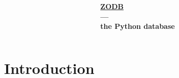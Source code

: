 \documentclass[aspectratio=169]{beamer}
\begin{document}
{
\begin{frame}[plain,t]
  \begin{columns}[onlytextwidth]
    \begin{column}{0.45\textwidth}
    \end{column}
    \begin{column}{0.45\textwidth}
      \vspace{0.5cm}
      \par
      \centering
      ~\\~
      \vspace{0.5cm}
      \par
      \Huge
      \bfseries
      \href{http://zodb.org}{ZODB}\\
      ---\\
      the Python database
    \end{column}
  \end{columns}
\end{frame}
}

\section{Introduction}
\end{document}
